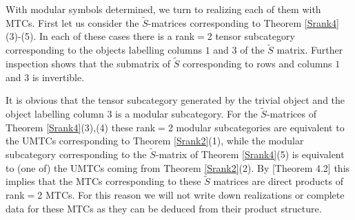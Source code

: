 \documentclass[12pt,psamsfonts]{amsart}
\newcommand{\CC}{\mathcal{C}}
\newcommand{\F}{\mathcal{F}}
\newcommand{\tS}{\tilde{S}}
\numberwithin{equation}{section}
\newtheorem{prop}[theorem]{Proposition}
\theoremstyle{definition}
\begin{document}
With modular symbols determined, we turn to realizing each of them
with MTCs.   First let us consider the $\tS$-matrices
corresponding to Theorem \ref{Srank4}(3)-(5).  In each of these
cases there is a rank$=$2 tensor subcategory corresponding to the
objects labelling columns $1$ and $3$ of the $\tS$ matrix. Further
inspection shows that the submatrix of $\tS$ corresponding to rows
and columns $1$ and $3$ is invertible.

It is obvious that the tensor subcategory generated by the trivial
object and the object labelling column $3$ is a modular
subcategory.  For the $\tS$-matrices of Theorem
\ref{Srank4}(3),(4) these rank$=$2 modular subcategories are
equivalent to the UMTCs corresponding to
Theorem \ref{Srank2}(1), while the modular subcategory
corresponding to the $\tS$-matrix of Theorem \ref{Srank4}(5) is
equivalent to (one of) the UMTCs coming from
Theorem \ref{Srank2}(2).  By \cite{MugerLMS}[Theorem 4.2] this
implies that the MTCs corresponding to these $\tS$ matrices are
direct products of rank$=$2 MTCs.  For this reason we will not
write down realizations or complete data for these MTCs as they
can be deduced from their product structure.
\end{document}

